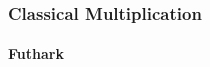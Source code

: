 \begin{frame}[fragile]
  \frametitle{Classical Multiplication}
  \framesubtitle{Futhark}
\end{frame}

